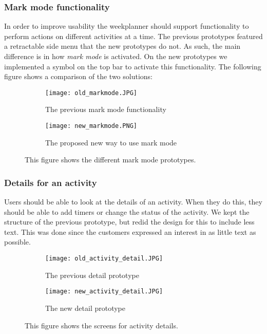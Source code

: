 \subsubsection{Mark mode functionality}
In order to improve usability the weekplanner should support functionality to perform actions on different activities at a time.
The previous prototypes featured a retractable side menu that the new prototypes do not.
As such, the main difference is in how \textit{mark mode} is activated. 
On the new prototypes we implemented a symbol on the top bar to activate this functionality.
The following figure shows a comparison of the two solutions:

\begin{figure}[H]
    \begin{subfigure}{0.5\textwidth}
    \texttt{[image: old\_markmode.JPG]} 
    \caption{The previous mark mode functionality}
    \label{fig:old_markmode}
    \end{subfigure}
    \begin{subfigure}{0.5\textwidth}
        \texttt{[image: new\_markmode.PNG]}
    \caption{The proposed new way to use mark mode}
    \label{fig:new_markmode}
    \end{subfigure} 
    \caption{This figure shows the different mark mode prototypes.}
    \label{fig:markmode_prototypes}
\end{figure}

\subsubsection{Details for an activity}
Users should be able to look at the details of an activity.
When they do this, they should be able to add timers or change the status of the activity.
We kept the structure of the previous prototype, but redid the design for this to include less text. 
This was done since the customers expressed an interest in as little text as possible.
\begin{figure}[H]
    \begin{subfigure}{0.5\textwidth}
    \texttt{[image: old\_activity\_detail.JPG]} 
    \caption{The previous detail prototype}
    \label{fig:old_activity_detail}
    \end{subfigure}
    \begin{subfigure}{0.5\textwidth}
        \texttt{[image: new\_activity\_detail.JPG]}
    \caption{The new detail prototype}
    \label{fig:new_activity_details}
    \end{subfigure} 
    \caption{This figure shows the screens for activity details.}
    \label{fig:activity_detail_prototypes}
\end{figure}

